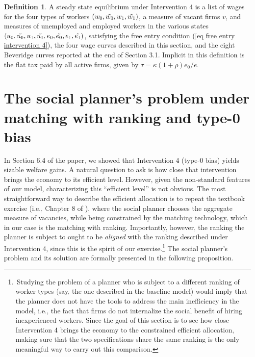 \documentclass[12pt]{article} %
\theoremstyle{definition}
\newtheorem{definition}{Definition}%
\begin{document}
\medskip

\begin{definition}\label{definition equilibrium}
	A steady state equilibrium under Intervention 4 is a list of wages for the four types of workers $(w_0, \Tilde{w_0}, w_1, \Tilde{w_1})$, a measure of vacant firms $v$, and measures of unemployed and employed workers in the various states $(u_0, \Tilde{u_0}, u_1, \Tilde{u_1}, e_0, \Tilde{e_0}, e_1, \Tilde{e_1})$, satisfying the free entry condition (\ref{eq free entry intervention 4}), the four wage curves described in this section, and the eight Beveridge curves reported at the end of Section 3.1. %
    Implicit in this definition is the flat tax paid by all active firms, given by $\tau = \kappa(1+\rho)e_0/e$. 
\end{definition} 


\section{The social planner's problem under matching with ranking and type-0 bias \label{section appendix SSPP}}


In Section 6.4 of the paper, we showed that Intervention 4 (type-0 bias) yields sizable welfare gains. A natural question to ask is how close that intervention brings the economy to its efficient level. However, given the non-standard features of our model, characterizing this ``efficient level'' is not obvious. 
The most straightforward way to describe the efficient allocation is to repeat the textbook exercise (i.e., Chapter 8 of \citealt{pissarides2000equilibrium}), where the social planner chooses the aggregate measure of vacancies, while being constrained by the matching technology, which in our case is the \cite{petrongolo2001looking} matching with ranking. Importantly, however, the ranking the planner is subject to ought to be \textit{aligned} with the ranking described under Intervention 4, since this is the spirit of our exercise.\footnote{\,Studying the problem of a planner who is subject to a different ranking of worker types (say, the one described in the baseline model) would imply that the planner does not have the tools to address the main inefficiency in the model, i.e., the fact that firms do not internalize the social benefit of hiring inexperienced workers. Since the goal of this section is to see how close Intervention 4 brings the economy to the constrained efficient allocation, making sure that the two specifications share the same ranking is the only meaningful way to carry out this comparison.} The social planner's problem and its solution are formally presented in the following proposition. 
\end{document}
